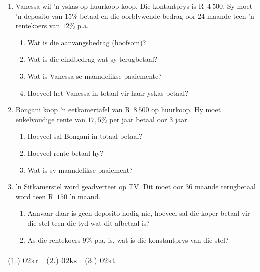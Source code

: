 \begin{exercises}{}
{
    \begin{enumerate}[label=\textbf{\arabic*}.]
	\item Vanessa wil 'n yskas op huurkoop koop. Die kontantprys is R~$4~500$. Sy moet 'n deposito van $15\%$ betaal en die oorblywende bedrag oor $24$ maande teen 'n rentekoers van $12\%$ p.a.
\begin{enumerate}[noitemsep, label=\textbf{(\alph*)} ]
	    \item Wat is die aanvangsbedrag (hoofsom)?
	    \item Wat is die eindbedrag wat sy terugbetaal?
	    \item Wat is Vanessa se maandelikse paaiemente?
	    \item Hoeveel het Vanessa in totaal vir haar yskas betaal?
	\end{enumerate}
	\item Bongani koop ’n eetkamertafel van R~$8~500$ op huurkoop. Hy moet enkelvoudige rente van $17,5\%$ per jaar betaal oor 3 jaar.
\begin{enumerate}[noitemsep, label=\textbf{(\alph*)} ]
	    \item Hoeveel sal Bongani in totaal betaal?
	    \item Hoeveel rente betaal hy?
	    \item Wat is sy maandelikse paaiement?
	\end{enumerate}
	\item 'n Sitkamerstel word geadverteer op TV. Dit moet oor $36$ maande terugbetaal word teen R~$150$ 'n maand.
\begin{enumerate}[noitemsep, label=\textbf{(\alph*)} ]
	    \item Aanvaar daar is geen deposito nodig nie, hoeveel sal die koper betaal vir die stel teen die tyd wat dit afbetaal is?
	    \item As die rentekoers $9\%$ p.a. is, wat is die konstantprys van die stel?\\
	\end{enumerate}
    \end{enumerate}

\par \practiceinfo
\par \begin{tabular}[h]{cccccc}
(1.)	02kr	&
(2.)	02ks	&
(3.)	02kt	&
\end{tabular}
}
\end{exercises}




